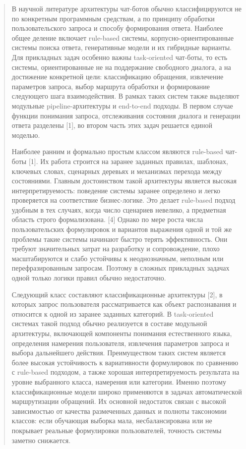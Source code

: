 \begin{quote}
В научной литературе архитектуры чат-ботов обычно классифицируются не по
конкретным программным средствам, а по принципу обработки
пользовательского запроса и способу формирования ответа. Наиболее общее
деление включает rule-based системы, корпусно-ориентированные системы
поиска ответа, генеративные модели и их гибридные варианты. Для
прикладных задач особенно важны task-oriented чат-боты, то есть системы,
ориентированные не на поддержание свободного диалога, а на достижение
конкретной цели: классификацию обращения, извлечение параметров запроса,
выбор маршрута обработки и формирование следующего шага взаимодействия.
В рамках таких систем также выделяют модульные pipeline-архитектуры и
end-to-end подходы. В первом случае функции понимания запроса,
отслеживания состояния диалога и генерации ответа разделены {[}1{]}, во
втором часть этих задач решается единой моделью.

Наиболее ранним и формально простым классом являются rule-based чат-боты
{[}1{]}. Их работа строится на заранее заданных правилах, шаблонах,
ключевых словах, сценарных деревьях и механизмах перехода между
состояниями. Главным достоинством такой архитектуры является высокая
интерпретируемость: поведение системы заранее определено и легко
проверяется на соответствие бизнес-логике. Это делает rule-based подход
удобным в тех случаях, когда число сценариев невелико, а предметная
область строго формализована. {[}4{]} Однако по мере роста числа
пользовательских формулировок и вариантов выражения одной и той же
проблемы такие системы начинают быстро терять эффективность. Они требуют
значительных затрат на разработку и сопровождение, плохо масштабируются
и слабо устойчивы к неоднозначным, неполным или перефразированным
запросам. Поэтому в сложных прикладных задачах одной только логики
правил обычно недостаточно.

Следующий класс составляют классификационные архитектуры {[}2{]}, в
которых запрос пользователя рассматривается как объект распознавания и
относится к одной из заранее заданных категорий. В task-oriented
системах такой подход обычно реализуется в составе модульной
архитектуры, включающей компоненты понимания естественного языка,
определения намерения пользователя, извлечения параметров запроса и
выбора дальнейшего действия. Преимуществом таких систем является более
высокая устойчивость к вариативности формулировок по сравнению с
rule-based подходом, а также хорошая интерпретируемость результата на
уровне выбранного класса, намерения или категории. Именно поэтому
классификационные модели широко применяются в задачах автоматической
маршрутизации обращений. Их основной недостаток связан с высокой
зависимостью от качества размеченных данных и полноты таксономии
классов: если обучающая выборка мала, несбалансирована или не покрывает
реальные формулировки пользователей, точность системы заметно снижается.


\end{quote}
